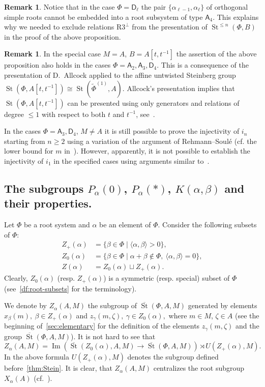 \documentclass[oneside, 8pt]{amsart}
\theoremstyle{remark}
\theoremstyle{definition}
\numberwithin{lemma}{section}
\numberwithin{prop}{section}
\numberwithin{corollary}{section}
\numberwithin{externaltheorem}{section}
\newtheorem{rem}[lemma]{Remark}
\DeclareMathOperator{\Img}{Im}
\DeclareMathOperator{\St}{St}
\newcommand{\inv}{^{-1}}
\newcommand{\rA}{\mathsf{A}}
\newcommand{\rD}{\mathsf{D}}
\numberwithin{equation}{section}
\begin{document}
\begin{rem}
 Notice that in the case $\Phi=\rD_\ell$ the pair $\{\alpha_{\ell-1}, \alpha_{\ell}\}$ of orthogonal simple roots cannot be embedded into a root subsystem of type $\rA_4$. This explains why we needed to exclude relations $\text{R3}^\bot$ from the presentation of $\St^{\leq n}(\Phi, B)$ in the proof of the above proposition.
\end{rem}
\begin{rem}
 In the special case $M=A$, $B = A[t, t\inv]$ the assertion of the above proposition also holds in the cases $\Phi=\rA_2, \rA_3, \rD_4$. This is a consequence of the presentation of D.~Allcock applied to the affine untwisted Steinberg group $\St(\Phi, A[t, t\inv]) \cong \St(\widetilde{\Phi}^{(1)}, A)$. Allcock's presentation implies that $\St(\Phi, A[t, t\inv])$ can be presented using only generators and relations of degree $\leq 1$ with respect to both $t$ and $t^{-1}$, see~\cite[Corollary~1.3]{A13}.
 
 In the cases $\Phi = \rA_3, \rD_4$, $M \neq A$ it is still possible to prove the injectivity of $i_n$ starting from $n\geq 2$ using a variation of the argument of Rehmann--Soul{\'e} (cf. the lower bound for $m$ in~\cite[3.2.1]{RS76}). However, apparently, it is not possible to establish the injectivity of $i_1$ in the specified cases using arguments similar to~\cite{RS76}.
\end{rem}

\subsection{The subgroups \texorpdfstring{$P_\alpha(0)$}{Pa(0)}, \texorpdfstring{$P_\alpha(*)$}{Pa(*)}, \texorpdfstring{$K(\alpha, \beta)$}{K(a,b)} and their properties.} \label{sec:Pa0-basic}
Let $\Phi$ be a root system and $\alpha$ be an element of $\Phi$.
Consider the following subsets of $\Phi$:
\begin{align} Z_+(\alpha) & = \{ \beta \in \Phi \mid \langle \alpha, \beta \rangle > 0 \}, \\
   Z_0(\alpha) & = \{ \beta \in \Phi \mid \alpha + \beta \not\in \Phi,\ \langle \alpha, \beta \rangle = 0 \}, \\
   Z(\alpha)   & = Z_0(\alpha) \sqcup Z_+(\alpha). \end{align}
Clearly, $Z_0(\alpha)$ (resp. $Z_+(\alpha)$) is a symmetric (resp. special) subset of $\Phi$ (see~\cref{df:root-subsets} for the terminology).
   
We denote by $Z_\alpha(A, M)$ the subgroup of $\overline{\St}(\Phi, A, M)$ generated by elements
 $x_{\beta}(m),\ \beta \in Z_+(\alpha)$ and $z_{\gamma}(m, \zeta),\ \gamma \in Z_0(\alpha),$ where $m \in M$, $\zeta \in A$ (see the beginning of~\cref{sec:elementary} for the definition of the elements $z_\gamma(m, \zeta)$ and the group $\overline{\St}(\Phi, A, M)$).
It is not hard to see that \[Z_\alpha(A, M) = \Img\left(\overline{\St}(Z_0(\alpha), A, M) \to \overline{\St}(\Phi, A, M)\right) \rtimes U(Z_+(\alpha), M). \]
In the above formula $U(Z_+(\alpha), M)$ denotes the subgroup defined before~\cref{thm:Stein}.
It is clear, that $Z_\alpha(A, M)$ centralizes the root subgroup $X_\alpha(A)$ (cf.~\cite[984]{St71}).
\end{document}
